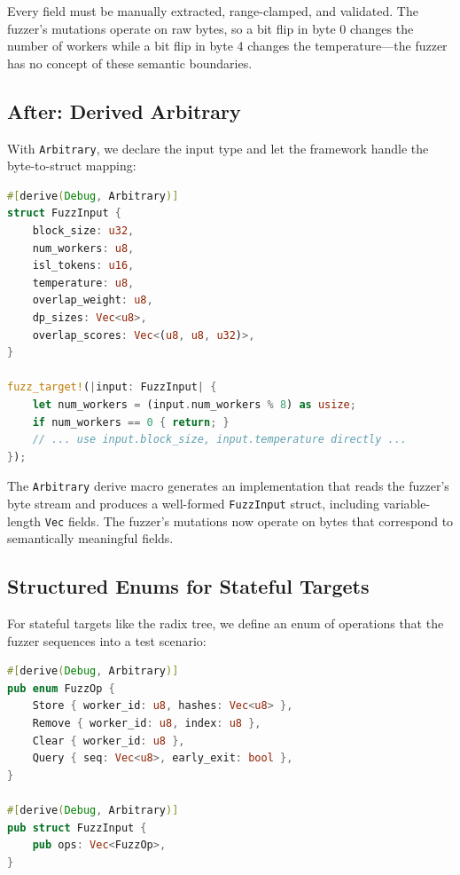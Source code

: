 Every field must be manually extracted, range-clamped, and validated. The fuzzer's mutations operate on raw bytes, so a bit flip in byte 0 changes the number of workers while a bit flip in byte 4 changes the temperature---the fuzzer has no concept of these semantic boundaries.

\subsection{After: Derived Arbitrary}

With \texttt{Arbitrary}, we declare the input type and let the framework handle the byte-to-struct mapping:

\begin{lstlisting}[language=Rust,caption={Structured input with \texttt{Arbitrary}: the fuzzer generates typed values directly.}]
#[derive(Debug, Arbitrary)]
struct FuzzInput {
    block_size: u32,
    num_workers: u8,
    isl_tokens: u16,
    temperature: u8,
    overlap_weight: u8,
    dp_sizes: Vec<u8>,
    overlap_scores: Vec<(u8, u8, u32)>,
}

fuzz_target!(|input: FuzzInput| {
    let num_workers = (input.num_workers % 8) as usize;
    if num_workers == 0 { return; }
    // ... use input.block_size, input.temperature directly ...
});
\end{lstlisting}

The \texttt{Arbitrary} derive macro generates an implementation that reads the fuzzer's byte stream and produces a well-formed \texttt{FuzzInput} struct, including variable-length \texttt{Vec} fields. The fuzzer's mutations now operate on bytes that correspond to semantically meaningful fields.

\subsection{Structured Enums for Stateful Targets}

For stateful targets like the radix tree, we define an enum of operations that the fuzzer sequences into a test scenario:

\begin{lstlisting}[language=Rust,caption={Operation enum for stateful fuzzing of the KV-cache indexer.}]
#[derive(Debug, Arbitrary)]
pub enum FuzzOp {
    Store { worker_id: u8, hashes: Vec<u8> },
    Remove { worker_id: u8, index: u8 },
    Clear { worker_id: u8 },
    Query { seq: Vec<u8>, early_exit: bool },
}

#[derive(Debug, Arbitrary)]
pub struct FuzzInput {
    pub ops: Vec<FuzzOp>,
}
\end{lstlisting}

